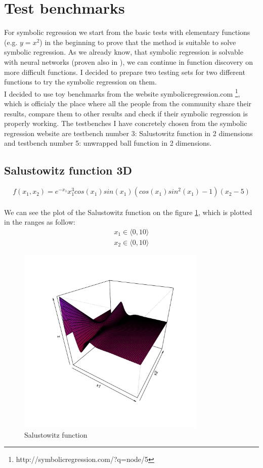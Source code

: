 \documentclass[a4paper,oneside,onecolumn,11pt]{report}
\begin{document}
	\section{Test benchmarks}
	\label{benchmarks}
		For symbolic regression we start from the basic tests with elementary functions (e.g.
		$y = x^2$) in the beginning to prove that the method is suitable to solve symbolic
		regression. As we already know, that symbolic regression is solvable with neural 
		networks (proven also in \cite{varacha2006}), we can continue in function discovery
		on more difficult functions. I decided to prepare two testing sets for two different
		functions to try the symbolic regression on them.\\

		I decided to use toy benchmarks from the website symbolicregression.com
		\footnote{http://symbolicregression.com/?q=node/5}, which is officialy the place
		where all the people from the community share their results, compare them to other
		results and check if their symbolic regression is properly working. The testbenches I 
		have concretely chosen from the symbolic regression website are testbench number 3: 
		Salustowitz function in 2 dimensions and testbench number 5: unwrapped ball function 
		in 2 dimensions.
		\subsection{Salustowitz function 3D}
			\begin{equation}
				f(x_1, x_2) = e^{-x_1} x_1^3 cos(x_1) sin(x_1) (cos(x_1) sin^2(x_1) - 1) (x_2 - 5)
			\end{equation}\\
			We can see the plot of the Salustowitz function on the figure \ref{salustowitz}, which is 
			plotted in the ranges as follow:
			\begin{equation}
				\begin{aligned}
				x_1 \in \langle 0, 10 \rangle\\
				x_2 \in \langle 0, 10 \rangle
				\end{aligned}
			\end{equation}

			\begin{figure}
				\centering
				\includegraphics[width=90mm]{fig/salustowitz_col.pdf}
				\caption{Salustowitz function}
				\label{salustowitz}
			\end{figure}
\end{document}
